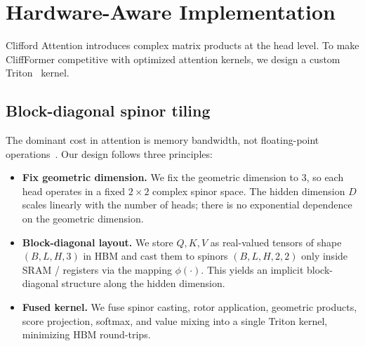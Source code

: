 \documentclass{article}
\theoremstyle{plain}
\theoremstyle{definition}
\theoremstyle{remark}
\begin{document}
\section{Hardware-Aware Implementation}
\label{sec:system_opt}

Clifford Attention introduces complex matrix products at the head level. To make CliffFormer competitive with optimized attention kernels, we design a custom Triton~\cite{tillet2019triton} kernel.

\subsection{Block-diagonal spinor tiling}

The dominant cost in attention is memory bandwidth, not floating-point operations~\cite{dao2022flashattention}. Our design follows three principles:

\begin{itemize}
    \item \textbf{Fix geometric dimension.} We fix the geometric dimension to $3$, so each head operates in a fixed $2\times2$ complex spinor space. The hidden dimension $D$ scales linearly with the number of heads; there is no exponential dependence on the geometric dimension.
    \item \textbf{Block-diagonal layout.} We store $Q,K,V$ as real-valued tensors of shape $(B,L,H,3)$ in HBM and cast them to spinors $(B,L,H,2,2)$ only inside SRAM / registers via the mapping $\phi(\cdot)$. This yields an implicit block-diagonal structure along the hidden dimension.
    \item \textbf{Fused kernel.} We fuse spinor casting, rotor application, geometric products, score projection, softmax, and value mixing into a single Triton kernel, minimizing HBM round-trips.
\end{itemize}
\end{document}
